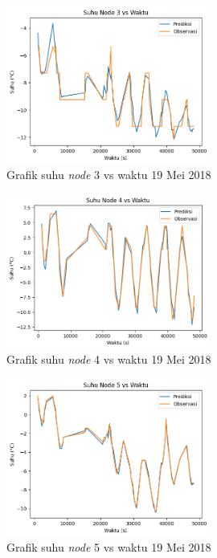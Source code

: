 \begin{figure}[H]
\setlength{}
\begin{center}
\includegraphics[width=0.6\textwidth]{fig/node3_temp_2018-05-19.png}
	\caption{Grafik suhu \textit{node} 3 vs waktu 19 Mei 2018}
\label{fig:node319}
\end{center}
\end{figure}

\begin{figure}[H]
\setlength{}
\begin{center}
\includegraphics[width=0.6\textwidth]{fig/node4_temp_2018-05-19.png}
	\caption{Grafik suhu \textit{node} 4 vs waktu 19 Mei 2018}
\label{fig:node419}
\end{center}
\end{figure}

\begin{figure}[H]
\setlength{}
\begin{center}
\includegraphics[width=0.6\textwidth]{fig/node5_temp_2018-05-19.png}
	\caption{Grafik suhu \textit{node} 5 vs waktu 19 Mei 2018}
\label{fig:node519}
\end{center}
\end{figure}

